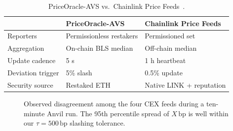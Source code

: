 \begin{table}[t]
  \centering
  \caption{PriceOracle-AVS vs.\ Chainlink Price
           Feeds~\cite{breidenbach2021chainlink}.}
  \label{tab:vs-chainlink}
  \begin{tabular}{lll}
    \toprule
                       & PriceOracle-AVS & Chainlink Price Feeds \\
    \midrule
    Reporters          & Permissionless restakers & Permissioned set \\
    Aggregation        & On-chain BLS median & Off-chain median \\
    Update cadence     & 5 s              & 1 h heartbeat \\
    Deviation trigger  & 5\% slash        & 0.5\% update \\
    Security source    & Restaked ETH     & Native LINK + reputation \\
    \bottomrule
  \end{tabular}
\end{table}



\begin{figure}[t]
  \centering
  \caption{Observed disagreement among the four CEX feeds during a
           ten-minute Anvil run.  The 95th percentile spread of
           $X\,\mathrm{bp}$ is well within our $\tau{=}500\,\mathrm{bp}$
           slashing tolerance.}
  \label{fig:cex-spread}
\end{figure}
